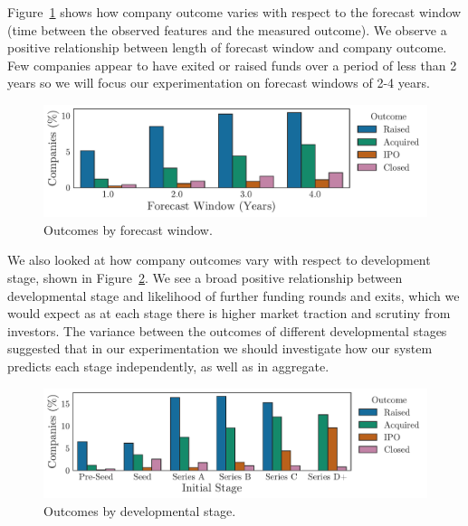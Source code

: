 \documentclass[../thesis/thesis.tex]{subfiles}
\begin{document}
Figure~\ref{fig:evaluation:outcome_forecast_window} shows how company outcome varies with respect to the forecast window (time between the observed features and the measured outcome). We observe a positive relationship between length of forecast window and company outcome. Few companies appear to have exited or raised funds over a period of less than 2 years so we will focus our experimentation on forecast windows of 2-4 years.

\begin{figure}[!htb]
    \centering
    \includegraphics[width=\textwidth]{../figures/evaluation/outcomes_window}
    \caption[Outcomes by forecast window]{Outcomes by forecast window.}
    \label{fig:evaluation:outcome_forecast_window}
\end{figure}

We also looked at how company outcomes vary with respect to development stage, shown in Figure~\ref{fig:evaluation:outcome_stage}. We see a broad positive relationship between developmental stage and likelihood of further funding rounds and exits, which we would expect as at each stage there is higher market traction and scrutiny from investors. The variance between the outcomes of different developmental stages suggested that in our experimentation we should investigate how our system predicts each stage independently, as well as in aggregate.

\begin{figure}[!htb]
    \centering
    \includegraphics[width=\textwidth]{../figures/evaluation/outcomes_stage}
    \caption[Outcomes by developmental stage]{Outcomes by developmental stage.}
    \label{fig:evaluation:outcome_stage}
\end{figure}
\end{document}
